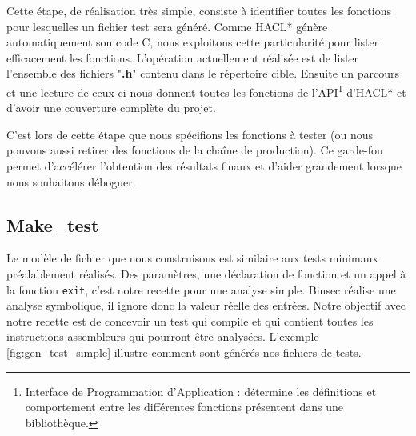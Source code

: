 Cette étape, de réalisation très simple, consiste à identifier toutes les fonctions pour lesquelles un fichier test sera généré. Comme HACL* génère automatiquement son code C, nous exploitons cette particularité pour lister efficacement les fonctions. L'opération actuellement réalisée est de lister l'ensemble des fichiers "\textbf{.h}" contenu dans le répertoire cible. Ensuite un parcours et une lecture de ceux-ci nous donnent toutes les fonctions de l'API\footnote{Interface de Programmation d'Application : détermine les définitions et comportement entre les différentes fonctions présentent dans une bibliothèque.} d'HACL* et d'avoir une couverture complète du projet.\smallbreak

C'est lors de cette étape que nous spécifions les fonctions à tester (ou nous pouvons aussi retirer des fonctions de la chaîne de production). Ce garde-fou permet d'accélérer l'obtention des résultats finaux et d'aider grandement lorsque nous souhaitons déboguer.

\subsection*{Make\_test}

Le modèle de fichier que nous construisons est similaire aux tests minimaux préalablement réalisés. Des paramètres, une déclaration de fonction et un appel à la fonction \texttt{exit}, c'est notre recette pour une analyse simple. Binsec réalise une analyse symbolique, il ignore donc la valeur réelle des entrées. Notre objectif avec notre recette est de concevoir un test qui compile et qui contient toutes les instructions assembleurs qui pourront être analysées. L'exemple \ref{fig:gen_test_simple} illustre comment sont générés nos fichiers de tests.\medbreak

